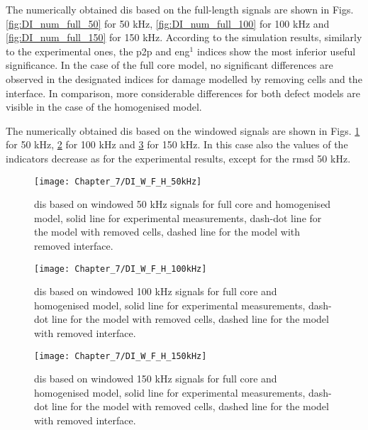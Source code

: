 The numerically obtained \acp{di} based on the full-length signals are shown in Figs. \ref{fig:DI_num_full_50} for 50 kHz, \ref{fig:DI_num_full_100} for 100 kHz and \ref{fig:DI_num_full_150} for 150 kHz.
According to the simulation results, similarly to the experimental ones, the \ac{p2p} and \ac{eng}\(^1\) indices show the most inferior useful significance.
In the case of the full core model, no significant differences are observed in the designated indices for damage modelled by removing cells and the interface.
In comparison, more considerable differences for both defect models are visible in the case of the homogenised model.

The numerically obtained \acp{di} based on the windowed signals are shown in Figs. \ref{fig:DI_num_win_50} for 50 kHz, \ref{fig:DI_num_win_100} for 100 kHz and \ref{fig:DI_num_win_150} for 150 kHz.
In this case also the values of the indicators decrease as for the experimental results, except for the \ac{rmsd} 50 kHz.
\begin{figure}[!tbh]
	\begin{center}
		\texttt{[image: Chapter\_7/DI\_W\_F\_H\_50kHz]}
	\end{center}
	\caption{\acp{di} based on windowed 50 kHz signals for full core and homogenised model, solid line for experimental measurements, dash-dot line for the model with removed cells, dashed line for the model with removed interface.}
	\label{fig:DI_num_win_50}
\end{figure}
\begin{figure}[!tbh]
	\begin{center}
		\texttt{[image: Chapter\_7/DI\_W\_F\_H\_100kHz]}
	\end{center}
	\caption{\acp{di} based on windowed 100 kHz signals for full core and homogenised model, solid line for experimental measurements, dash-dot line for the model with removed cells, dashed line for the model with removed interface.}
	\label{fig:DI_num_win_100}
\end{figure}
\begin{figure}[!tbh]
	\begin{center}
		\texttt{[image: Chapter\_7/DI\_W\_F\_H\_150kHz]}
	\end{center}
	\caption{\acp{di} based on windowed 150 kHz signals for full core and homogenised model, solid line for experimental measurements, dash-dot line for the model with removed cells, dashed line for the model with removed interface.}
	\label{fig:DI_num_win_150}
\end{figure}
